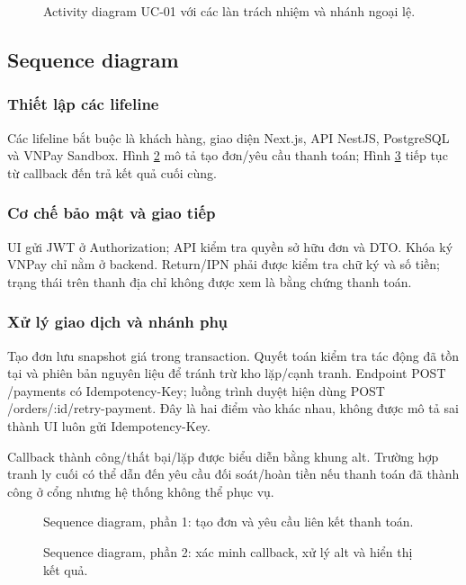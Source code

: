 \documentclass[12pt,a4paper]{article}
\begin{document}
\begin{figure}[p]\centering

\caption{Activity diagram UC-01 với các làn trách nhiệm và nhánh ngoại lệ.}
\label{fig:activity}
\end{figure}
\clearpage

\subsection{Sequence diagram}
\subsubsection{Thiết lập các lifeline}
Các lifeline bắt buộc là khách hàng, giao diện Next.js, API NestJS, PostgreSQL và VNPay Sandbox. Hình \ref{fig:sequence-taodon} mô tả tạo đơn/yêu cầu thanh toán; Hình \ref{fig:sequence-ketqua} tiếp tục từ callback đến trả kết quả cuối cùng.

\subsubsection{Cơ chế bảo mật và giao tiếp}
UI gửi JWT ở Authorization; API kiểm tra quyền sở hữu đơn và DTO. Khóa ký VNPay chỉ nằm ở backend. Return/IPN phải được kiểm tra chữ ký và số tiền; trạng thái trên thanh địa chỉ không được xem là bằng chứng thanh toán.

\subsubsection{Xử lý giao dịch và nhánh phụ}
Tạo đơn lưu snapshot giá trong transaction. Quyết toán kiểm tra tác động đã tồn tại và phiên bản nguyên liệu để tránh trừ kho lặp/cạnh tranh. Endpoint POST /payments có Idempotency-Key; luồng trình duyệt hiện dùng POST /orders/:id/retry-payment. Đây là hai điểm vào khác nhau, không được mô tả sai thành UI luôn gửi Idempotency-Key.

Callback thành công/thất bại/lặp được biểu diễn bằng khung alt. Trường hợp tranh ly cuối có thể dẫn đến yêu cầu đối soát/hoàn tiền nếu thanh toán đã thành công ở cổng nhưng hệ thống không thể phục vụ.

\begin{figure}[p]\centering

\caption{Sequence diagram, phần 1: tạo đơn và yêu cầu liên kết thanh toán.}
\label{fig:sequence-taodon}
\end{figure}
\begin{figure}[p]\centering

\caption{Sequence diagram, phần 2: xác minh callback, xử lý alt và hiển thị kết quả.}
\label{fig:sequence-ketqua}
\end{figure}
\clearpage
\end{document}

